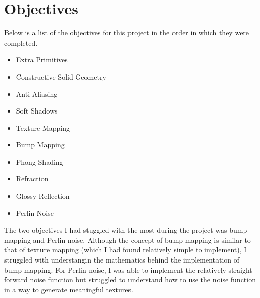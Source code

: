 \section{Objectives}
Below is a list of the objectives for this project in the order in which they
were completed. 

\begin{itemize}
  \item Extra Primitives
  \item Constructive Solid Geometry
  \item Anti-Aliasing
  \item Soft Shadows
  \item Texture Mapping
  \item Bump Mapping
  \item Phong Shading
  \item Refraction
  \item Glossy Reflection
  \item Perlin Noise
\end{itemize}

The two objectives I had stuggled with the most during the
project was bump mapping and Perlin noise. Although the concept of bump mapping
is similar to that of texture mapping (which I had found relatively simple to
implement), I struggled with understangin the mathematics behind the
implementation of bump mapping. For Perlin noise, I was able to implement the
relatively straight-forward noise function but struggled to understand how to
use the noise function in a way to generate meaningful textures.
